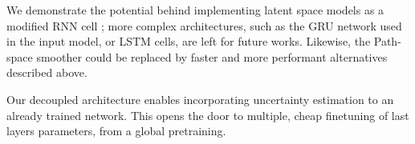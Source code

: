 \documentclass[journal]{IEEEtran}
\begin{document}
We demonstrate the potential behind implementing latent space models as a modified RNN cell ;
more complex architectures, such as the GRU network used in the input model, or LSTM cells, are left for future works.
Likewise, the Path-space smoother could be replaced by faster and more performant alternatives described above.

Our decoupled architecture enables incorporating uncertainty estimation to an already trained network.
This opens the door to multiple, cheap finetuning of last layers parameters, from a global pretraining.

\clearpage


\end{document}
